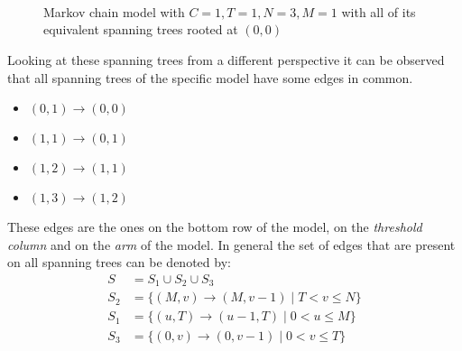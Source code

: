 \begin{figure}[H]
    \centering
    \scalebox{0.8}{
        }
        \vspace{0.8cm} \\
    \scalebox{0.6}{
        }
        \hspace{0.7cm}
    \scalebox{0.6}{
        }
        \vspace{0.4cm} \\
    \scalebox{0.6}{
        }
        \hspace{0.7cm}
    \scalebox{0.6}{
        }
        \vspace{0.4cm} \\
    \scalebox{0.6}{
        }
    \caption{Markov chain model with \(C=1, T=1, N=3, M=1\) with all of its
    equivalent spanning trees rooted at \((0,0)\)}
    \label{fig:example_spanning_trees_1131}
\end{figure}

Looking at these spanning trees from a different perspective it can be observed
that all spanning trees of the specific model have some edges in common.

\scriptsize
\begin{multicols}{4}
    \begin{itemize}
        \item \((0,1) \rightarrow (0,0)\)
        \item \((1,1) \rightarrow (0,1)\)
        \item \((1,2) \rightarrow (1,1)\)
        \item \((1,3) \rightarrow (1,2)\)
    \end{itemize}
\end{multicols}
\normalsize

These edges are the ones on the bottom row of the model, on the
\textit{threshold column} and on the \textit{arm} of the model.
In general the set of edges that are present on all spanning trees can be
denoted by:
\begin{align} \label{eq:common_edges_set}
    S &= S_1 \cup S_2 \cup S_3 \nonumber\\
    S_2 &= \{(M,v) \rightarrow (M,v-1) \; | \; T < v \leq N\} \nonumber \\
    S_1 &= \{(u,T) \rightarrow (u-1,T) \; | \; 0 < u \leq M\} \nonumber \\
    S_3 &= \{(0,v) \rightarrow (0,v-1) \; | \; 0 < v \leq T\} \nonumber \\
\end{align}

